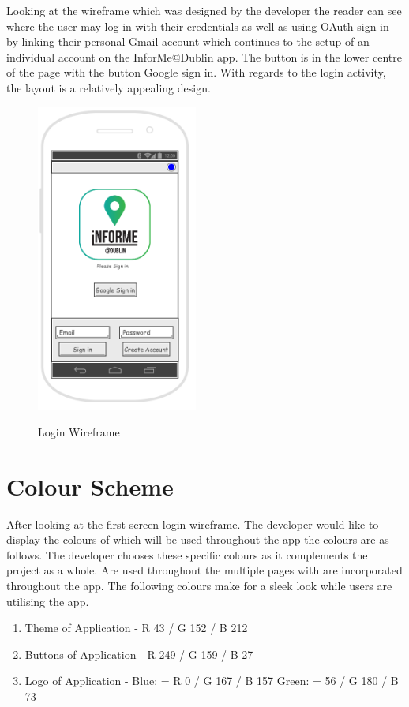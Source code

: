 \par 
Looking at the wireframe which was designed by the developer the reader can see where the user may log in with their credentials as well as using OAuth sign in by linking their personal Gmail account which continues to the setup of an individual account on the InforMe@Dublin app. The button is in the lower centre of the page with the button Google sign in. With regards to the login activity, the layout is a relatively appealing design.

\begin{figure}[htbp]
    \center \includegraphics[width=150pt]{LoginWireframe}\\
    \caption{Login Wireframe} \label{Figure: Login Wireframe}
\end{figure}
\newpage
\section{Colour Scheme}
After looking at the first screen login wireframe. The developer would like to display the colours of which will be used throughout the app the colours are as follows. The developer chooses these specific colours as it complements the project as a whole. Are used throughout the multiple pages with are incorporated throughout the app. The following colours make for a sleek look while users are utilising the app.

\begin{enumerate}
    \item Theme of Application - R 43 / G 152 / B 212
    \item Buttons of Application - R 249 / G 159 / B 27
    \item Logo of Application - Blue: = R 0 / G 167 / B 157    Green: = 56 / G 180 / B 73 
\end{enumerate}    

